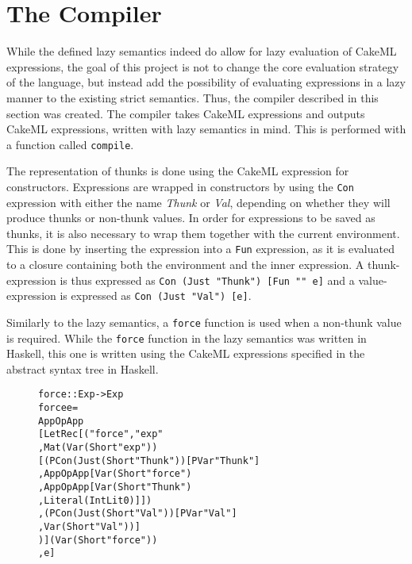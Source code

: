 \section{The Compiler}

While the defined lazy semantics indeed do allow for lazy evaluation of CakeML
expressions, the goal of this project is not to change the core evaluation
strategy of the language, but instead add the possibility of evaluating
expressions in a lazy manner to the existing strict semantics.
Thus, the compiler described in this section was
created. The compiler takes CakeML expressions and outputs CakeML expressions,
written with lazy semantics in mind. This is performed with a function called
\texttt{compile}.

The representation of thunks is done using the CakeML expression for
constructors. Expressions are wrapped in constructors by using the
\texttt{Con} expression with either the name
\textit{Thunk} or \textit{Val}, depending on whether they will produce thunks or
non-thunk values. In order for expressions to be saved as thunks, it is also
necessary to wrap them together with the current environment. This is done by
inserting the expression into a \texttt{Fun} expression, as it is evaluated to a
closure containing both the environment and the inner expression. A
thunk-expression is thus expressed as \texttt{Con (Just "Thunk") [Fun "" e]} and
a value-expression is expressed as \texttt{Con (Just "Val") [e]}.

Similarly to the lazy semantics, a \texttt{force} function is used when a
non-thunk value is required. While the \texttt{force} function in the lazy
semantics was written in Haskell, this one is written using the CakeML
expressions specified in the abstract syntax tree in Haskell.

\begin{figure}[!ht]
\begin{alltt}
force :: Exp -> Exp
force e =
App OpApp
  [LetRec [("force", "exp"
          , Mat (Var (Short "exp"))
            [(PCon (Just (Short "Thunk")) [PVar "Thunk"]
             , App OpApp [Var (Short "force")
                         , App OpApp [Var (Short "Thunk")
                                     , Literal (IntLit 0)]])
            ,(PCon (Just (Short "Val")) [PVar "Val"]
             , Var (Short "Val"))]
          )] (Var (Short "force"))
  , e]
\end{alltt}
\end{figure}

